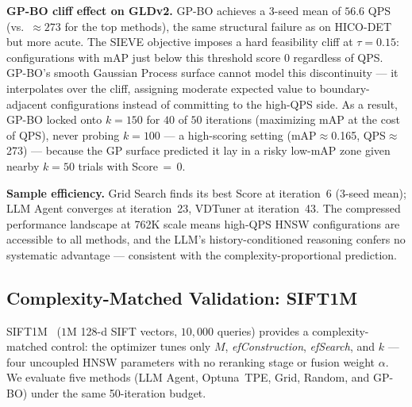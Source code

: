 \documentclass[sigconf, nonacm]{acmart}
\theoremstyle{definition}
\begin{document}
\noindent\textbf{GP-BO cliff effect on GLDv2.}
GP-BO achieves a 3-seed mean of $56.6$ QPS (vs.\ $\approx\!273$ for the top methods), the same structural failure as on HICO-DET but more acute.
The SIEVE objective imposes a hard feasibility cliff at $\tau{=}0.15$: configurations with mAP just below this threshold score $0$ regardless of QPS.
GP-BO's smooth Gaussian Process surface cannot model this discontinuity --- it interpolates over the cliff, assigning moderate expected value to boundary-adjacent configurations instead of committing to the high-QPS side.
As a result, GP-BO locked onto $k{=}150$ for $40$ of $50$ iterations (maximizing mAP at the cost of QPS), never probing $k{=}100$ --- a high-scoring setting (mAP$\approx$0.165, QPS$\approx$273) --- because the GP surface predicted it lay in a risky low-mAP zone given nearby $k{=}50$ trials with Score\,$=$\,$0$.

\noindent\textbf{Sample efficiency.}
Grid Search finds its best Score at iteration~6 (3-seed mean); LLM Agent converges at
iteration~23, VDTuner at iteration~43.
The compressed performance landscape at 762K scale means high-QPS HNSW configurations
are accessible to all methods, and the LLM's history-conditioned reasoning confers no
systematic advantage --- consistent with the complexity-proportional prediction.

\vspace{-5.25pt}
\subsection{Complexity-Matched Validation: SIFT1M}
\label{sec:sift1m}

SIFT1M~\cite{jegou2011pq} ($1$M 128-d SIFT vectors, $10{,}000$ queries) provides a complexity-matched control: the optimizer tunes only $M$, \textit{efConstruction}, \textit{efSearch}, and $k$ --- four uncoupled HNSW parameters with no reranking stage or fusion weight $\alpha$.
We evaluate five methods (LLM Agent, Optuna~TPE, Grid, Random, and GP-BO) under the same 50-iteration budget.
\end{document}
